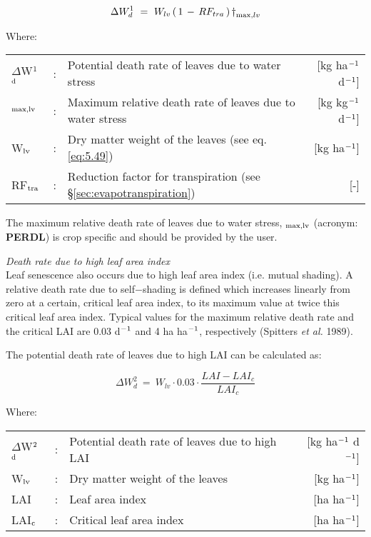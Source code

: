 \begin{equation}
\Delta W_{d}^{1} ~=~ W_{lv} \, (\, 1\, -\,RF_{tra} \, )\, {\rm \dag } _{\max ,lv} 
\end{equation}

Where:\\[5pt]
\begin{tabularx}{\textwidth}{llXr}
	$\Delta$W$^{{\rm 1}}$$_{{\rm d}}$ &:& Potential death rate of leaves due to water stress   &
	[kg  ha$^{{\rm -1}}$ d$^{{\rm -1}}$]\\
	\dag $_{{\rm max,lv}}$ &:& Maximum relative death rate of leaves due to
	water stress   &     [kg kg$^{{\rm -1}}$ d$^{{\rm -1}}$]\\
	W$_{{\rm lv}}$ &:& Dry matter weight of the leaves (see eq. \ref{eq:5.49})  &
	[kg ha$^{{\rm -1}}$]\\
	RF$_{{\rm tra}}$ &:& Reduction factor for transpiration (see \S \ref{sec:evapotranspiration})    &
	[-]\\
\end{tabularx}

The maximum relative death rate of leaves due to water stress, {\bf \dag $_{{\rm max,lv}}$} 
(acronym: {\bf PERDL}) is crop specific and should be provided by the user.

{\it Death rate due to high leaf area index}\\
Leaf senescence also occurs due to high leaf area index (i.e. mutual shading). A relative
death rate due to self$-$shading is defined which increases linearly from zero at a certain,
critical leaf area index, to its maximum value at twice this critical leaf area index. Typical
values for the maximum relative death rate and the critical LAI are 0.03 d$^{{\rm -1}}$ and 4 
ha ha$^{{\rm -}{1}}$, respectively (Spitters {\it et al.} 1989).

The potential death rate of leaves due to high LAI can be calculated as:

\begin{equation}
\label{eq:5.59}
\Delta W_{d}^{2} ~=~ W_{lv} \cdot 0.03 \cdot {\frac{LAI - LAI_c}{LAI_c}}
\end{equation}

Where:\\[5pt]
\begin{tabularx}{\textwidth}{llXr}
	$\Delta$W$^{{\rm 2}}$$_{{\rm d}}$ &:& Potential death rate of leaves due to 
	high LAI   &    [kg ha$^{{\rm -1}}$ d$^{{\rm -1}}$]\\
	W$_{{\rm lv}}$ &:& Dry matter weight of the leaves  &  [kg ha$^{{\rm -1}}$]\\
	LAI &:& Leaf area index   &    [ha ha$^{{\rm -1}}$]\\
	LAI$_{{\rm c}}$ &:& Critical leaf area index   &     [ha ha$^{{\rm -1}}$]\\
\end{tabularx}

